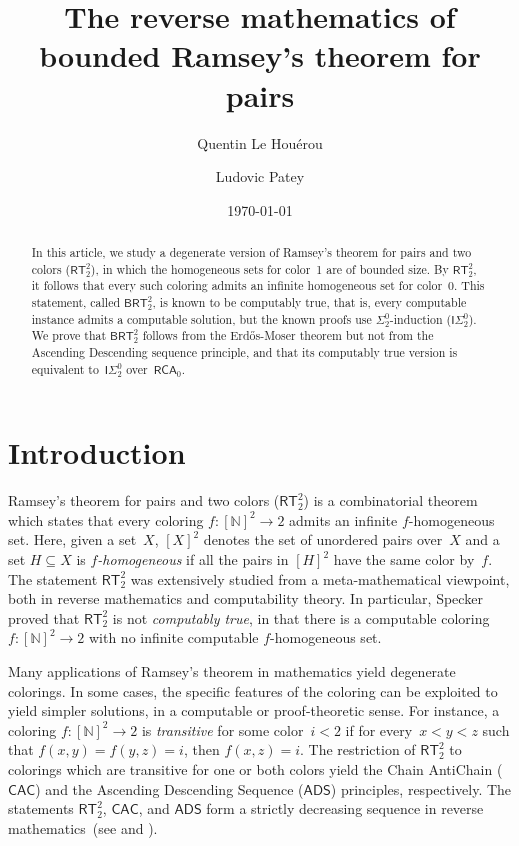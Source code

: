 \documentclass{article}
\title{The reverse mathematics of\\ bounded Ramsey's theorem for pairs}
\date{\today}
\author{Quentin Le Houérou \and Ludovic Patey}
\newcommand{\ISig}{\mathsf{I}\Sigma^0}
\newcommand{\RCA}[0]{\mathsf{RCA}}
\newcommand{\CAC}[0]{\mathsf{CAC}}
\newcommand{\ADS}[0]{\mathsf{ADS}}
\newcommand{\RT}[0]{\mathsf{RT}}
\newcommand{\BRT}[0]{\mathsf{BRT}}
\newcommand{\NN}[0]{\mathbb{N}}
\numberwithin{theorem}{section}
\begin{document}
\maketitle

\begin{abstract}
In this article, we study a degenerate version of Ramsey's theorem for pairs and two colors ($\RT^2_2$), in which the homogeneous sets for color~1 are of bounded size. By $\RT^2_2$, it follows that every such coloring admits an infinite homogeneous set for color~0. This statement, called $\BRT^2_2$, is known to be computably true, that is, every computable instance admits a computable solution, but the known proofs use $\Sigma^0_2$-induction ($\ISig_2$). We prove that $\BRT^2_2$ follows from the Erd\H{o}s-Moser theorem but not from the Ascending Descending sequence principle, and that its computably true version is equivalent to~$\ISig_2$ over~$\RCA_0$.
\end{abstract}

\section{Introduction}

Ramsey's theorem for pairs and two colors ($\RT^2_2$) is a combinatorial theorem which states that every coloring $f : [\NN]^2 \to 2$ admits an infinite $f$-homogeneous set. Here, given a set~$X$, $[X]^2$ denotes the set of unordered pairs over~$X$ and a set $H \subseteq X$ is \emph{$f$-homogeneous} if all the pairs in $[H]^2$ have the same color by~$f$. The statement $\RT^2_2$ was extensively studied from a meta-mathematical viewpoint, both in reverse mathematics and computability theory. In particular, Specker~\cite{specker_ramseys_1971} proved that $\RT^2_2$ is not \emph{computably true}, in that there is a computable coloring $f : [\NN]^2 \to 2$ with no infinite computable $f$-homogeneous set.

Many applications of Ramsey's theorem in mathematics yield degenerate colorings. In some cases, the specific features of the coloring can be exploited to yield simpler solutions, in a computable or proof-theoretic sense. For instance, a coloring $f : [\NN]^2 \to 2$ is \emph{transitive} for some color~$i < 2$ if for every~$x < y < z$ such that $f(x, y) = f(y, z) = i$, then $f(x, z) = i$. The restriction of $\RT^2_2$ to colorings which are transitive for one or both colors yield the Chain AntiChain ($\CAC$) and the Ascending Descending Sequence ($\ADS$) principles, respectively. The statements $\RT^2_2$, $\CAC$, and $\ADS$ form a strictly decreasing sequence in reverse mathematics~(see \cite[Corollary 3.12]{hirschfeldt_combinatorial_2007} and \cite[Theorem 1.7]{manuel_lerman_separating_2013}). 
\end{document}
